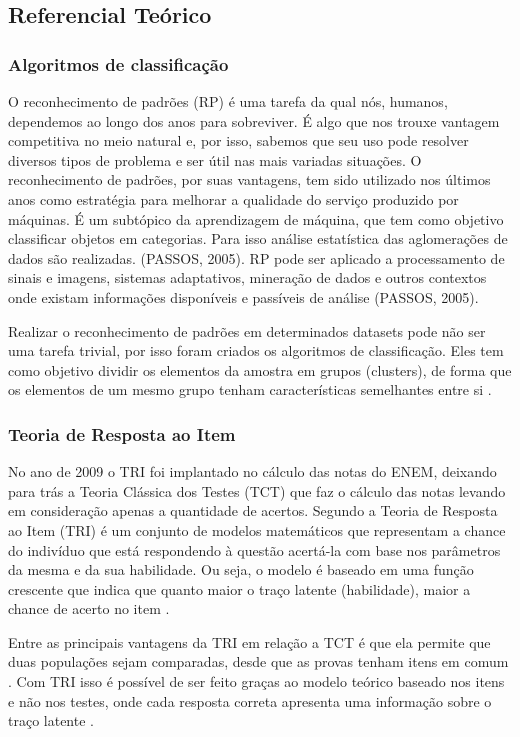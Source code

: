 \documentclass[article,	12pt,	oneside, a4paper,	english, brazil, sumario=tradicional, section=TITLE]{abntex2}
\begin{document}
\subsection{Referencial Teórico}

\subsubsection{Algoritmos de classificação}	
O reconhecimento de padrões (RP) é uma tarefa da qual nós, humanos, dependemos ao longo dos anos para sobreviver. É algo que nos trouxe vantagem competitiva no meio natural e, por isso, sabemos que seu uso pode resolver diversos tipos de problema e ser útil nas mais variadas situações. O reconhecimento de padrões, por suas vantagens, tem sido utilizado nos últimos anos como estratégia para melhorar a qualidade do serviço produzido por máquinas. É um subtópico da aprendizagem de máquina, que tem como objetivo classificar objetos em categorias. Para isso análise estatística das aglomerações de dados são realizadas. (PASSOS, 2005). RP pode ser aplicado a processamento de sinais e imagens, sistemas adaptativos, mineração de dados e outros contextos onde existam informações disponíveis e passíveis de análise (PASSOS, 2005).

Realizar o reconhecimento de padrões em determinados datasets pode não ser uma tarefa trivial, por isso foram criados os algoritmos de classificação. Eles tem como objetivo dividir os elementos da amostra em grupos (clusters), de forma que os elementos de um mesmo grupo tenham características semelhantes entre si .

\subsubsection{Teoria de Resposta ao Item}
No ano de 2009 o TRI foi implantado no cálculo das notas do ENEM, deixando para trás a Teoria Clássica dos Testes (TCT) que faz o cálculo das notas levando em consideração apenas a quantidade de acertos. Segundo  a Teoria de Resposta ao Item (TRI) é um conjunto de modelos matemáticos que representam a chance do indivíduo que está respondendo à questão acertá-la com base nos parâmetros da mesma e da sua habilidade. Ou seja, o modelo é baseado em uma função crescente que indica que quanto maior o traço latente (habilidade), maior a chance de acerto no item .                     

Entre as principais vantagens da TRI em relação a TCT é que ela permite que duas populações sejam comparadas, desde que as provas tenham itens em comum . Com TRI isso é possível de ser feito graças ao modelo teórico baseado nos itens e não nos testes, onde cada resposta correta apresenta uma informação sobre o traço latente .                                  
\end{document}
